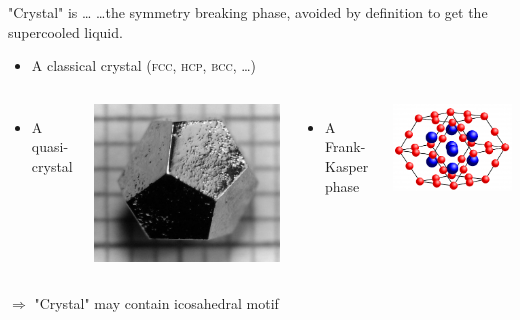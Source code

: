 \begin{frame}{"Crystal" is \ldots}
\ldots the symmetry breaking phase, avoided \alert{by definition} to get the supercooled liquid.
\begin{itemize}
	\item A classical crystal (\textsc{fcc, hcp, bcc}, \ldots)
\end{itemize}
\begin{columns}[T]
	\centering
	\begin{itemize}\item A quasi-crystal\end{itemize}
	\includegraphics[height=0.5\columnwidth]{Ho-Mg-ZnQuasicrystal.jpg}\\
	{\footnotesize\citet{Doye2003}}
	\centering
	\begin{itemize}\item A Frank-Kasper phase\end{itemize}
	\includegraphics[height=0.5\columnwidth]{frankkasper.png}\\
	{\footnotesize\citet{Pedersen2010, Coslovich2011}}
\end{columns}

\bigskip
$\Rightarrow$ "Crystal" may contain icosahedral motif
\end{frame}

